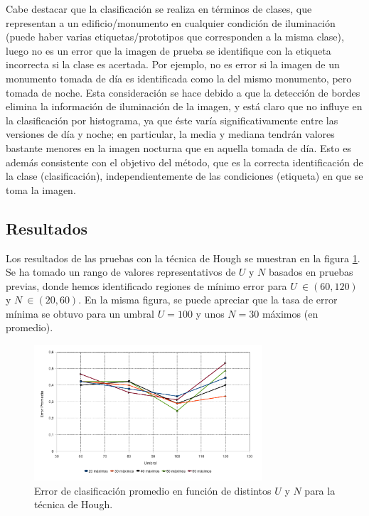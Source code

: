 \documentclass[conference,a4paper,10pt,oneside,final]{tfmpd}
\begin{document}
Cabe destacar que la clasificación se realiza en términos de clases, que
representan a un edificio/monumento en cualquier condición de iluminación
(puede haber varias etiquetas/prototipos que corresponden a la misma clase),
luego no es un error que la imagen de prueba se identifique con la etiqueta
incorrecta si la clase es acertada.
Por ejemplo, no es error si la imagen de un monumento tomada de día es
identificada como la del mismo monumento, pero tomada de noche.
Esta consideración se hace debido a que la detección de bordes elimina la
información de iluminación de la imagen, y está claro que no influye
en la clasificación por histograma, ya que éste varía significativamente
entre las versiones de día y noche; en particular, la media y mediana tendrán
valores bastante menores en la imagen nocturna que en aquella tomada de día.
Esto es además consistente con el objetivo del método, que es la correcta
identificación de la clase (clasificación), independientemente de las
condiciones (etiqueta) en que se toma la imagen.
%
%
\subsection{Resultados}
Los resultados de las pruebas con {la técnica} de Hough
se muestran en la figura
\ref{graficaerror}. Se ha tomado un rango de valores representativos de $U$
y $N$ basados en pruebas previas, donde hemos identificado regiones de mínimo
error para $U~\in(60,120)$ y $N~\in(20,60)$.
En la misma figura, se puede apreciar que la tasa de error mínima se obtuvo
para un umbral $U = 100$ y unos $N = 30$ máximos (en promedio).

\begin{figure}
\begin{center}
\includegraphics[width=8.5cm]{../diagramas/estadistica_noche_iguales}
\end{center}
\caption{Error de clasificación promedio en función de distintos $U$ y $N$ para
{la técnica} de Hough.}
\label{graficaerror}
\end{figure}
\end{document}
